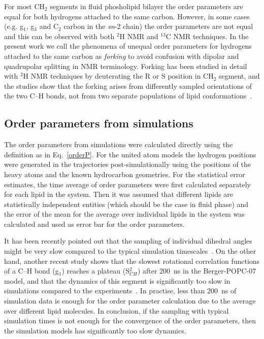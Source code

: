 \documentclass[journal=jacsat,manuscript=article]{achemso}
\begin{document}
For most CH$_2$ segments in fluid phosholipid bilayer the order parameters are equal for both hydrogens attached to the same carbon.
However, in some cases (e.g. g$_1$, g$_3$ and  C$_2$ carbon in the \textit{sn}-2 chain) the order parameters are not equal and this 
can be observed with both $^2$H NMR and $^{13}$C NMR techniques. In the present work we call the phenomena of unequal order parameters 
for hydrogens attached to the same carbon as {\it forking} to avoid confusion with dipolar and quadrupolar splitting in NMR terminology. 
Forking has been studied in detail with $^2$H NMR techniques by deuterating the R or S position in CH$_2$ segment, and
the studies show that the forking arises from differently sampled orientations of the two C--H bonds, not from two 
separate populations of lipid conformations~\cite{engel81,gally81}.



\subsection{Order parameters from simulations}
The order parameters from simulations were calculated directly using the definition as in Eq.~\ref{orderP}.
For the united atom models the hydrogen positions were generated 
in the trajectories post-simulationally using the positions of the heavy atoms and the known hydrocarbon geometries.
For the statistical error estimates, the time average of order parameters were first calculated separately
for each lipid in the system. Then it was assumed that different lipids are statistically independent 
entities (which should be the case in fluid phase) and the error of the mean for the average over individual 
lipids in the system was calculated and used as error bar for the order parameters.

It has been recently pointed out that the sampling of individual dihedral angles might be very
slow compared to the typical simulation timescales~\cite{vogel12}. On the other hand, another recent
study shows that the slowest rotational correlation functions of a C--H bond (g$_1$) reaches a plateau (S$_{CH}^2$)
after 200~ns in the Berger-POPC-07~\cite{ollila07a} model, and that the dynamics of this segment is significantly too slow in simulations
compared to the experiments~\cite{ferreira15}. In practise, less than 200~ns of simulation data is enough for the order parameter
calculation due to the average over different lipid molecules. In conclusion, if the sampling with typical simulation times
is not enough for the convergence of the order parameters, then the simulation models has significantly too slow dynamics.
\end{document}
